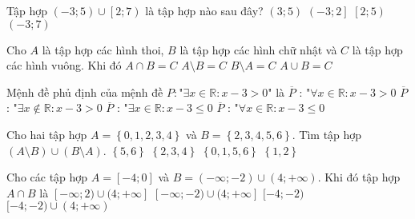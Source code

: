 \begin{ex}%
	Tập hợp $\left(-3;5\right)\cup\left[2;7\right)$ là tập hợp nào sau đây?
	\choice
	{$\left(3;5\right)$}
	{$\left(-3;2\right]$}
	{$\left[2;5\right)$}
	{\True$\left(-3;7\right)$}
		\loigiai{
	}
\end{ex}

\begin{ex}%
	Cho $A$ là tập hợp các hình thoi, $B$ là tập hợp các hình chữ nhật và $C$ là tập hợp các hình vuông. Khi đó
	\choice
	{\True $A\cap B=C $}
	{$A\setminus B=C$}
	{$B\setminus A=C$}
	{$A\cup B=C$}
\end{ex}

\begin{ex}%
	Mệnh đề phủ định của mệnh đề $P \colon $"$\exists x\in\mathbb{R}:x-3>0$" là
	\choice
	{$\overline{P}$ : "$\forall x\in\mathbb{R}:x-3>0$}
	{$\overline{P}$ : "$\exists x\notin\mathbb{R}:x-3>0$}
	{$\overline{P}$ : "$\exists x\in\mathbb{R}:x-3\leq 0$}
	{\True $\overline{P}$ : "$\forall x\in\mathbb{R}:x-3\leq 0$}
		\loigiai{
	}
\end{ex}

\begin{ex}%
	Cho hai tập hợp $A =\left\{0,1,2, 3, 4 \right\}$ và $B =\left\{ 2, 3, 4, 5, 6\right\}$. Tìm tập hợp $(A \setminus B) \cup (B \setminus A)$.
	\choice
	{$\left\{ 5, 6 \right\}$}
	{$\left\{ 2, 3, 4 \right\}$}
	{\True $\left\{ 0, 1, 5, 6 \right\}$}
	{$\left\{ 1, 2 \right\}$}
		\loigiai{
	}
\end{ex}

\begin{ex}%
	Cho các tập hợp $A=[-4;0]$ và $B=(-\infty ;-2)\cup (4;+\infty )$. Khi đó tập hợp $A\cap B$ là
	\choice
	{$[-\infty ; 2)\cup (4;+\infty ] $}
	{$[-\infty; -2)\cup (4;+\infty ] $}
	{\True $[-4;-2)$}
	{$[-4;-2)\cup (4;+\infty) $}
		\loigiai{
	}
\end{ex}

\begin{ex}%
\end{ex}

